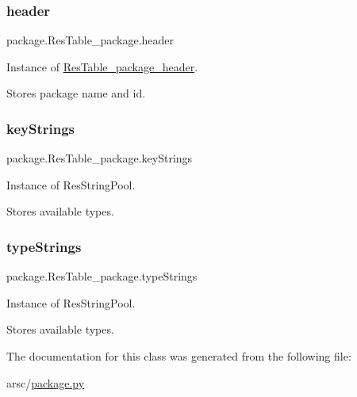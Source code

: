 \subsubsection{\texorpdfstring{header}{header}}
{\footnotesize\ttfamily package.\+Res\+Table\+\_\+package.\+header}



Instance of \mbox{\hyperlink{classpackage_1_1ResTable__package__header}{Res\+Table\+\_\+package\+\_\+header}}. 

Stores package name and id. \mbox{\label{classpackage_1_1ResTable__package_a6e813d4278285e770abe6e6659ae78e9}} 
\subsubsection{\texorpdfstring{key\+Strings}{keyStrings}}
{\footnotesize\ttfamily package.\+Res\+Table\+\_\+package.\+key\+Strings}



Instance of Res\+String\+Pool. 

Stores available types. \mbox{\label{classpackage_1_1ResTable__package_abb2bd37ba83fe03e836ecd869a1cafa6}} 
\subsubsection{\texorpdfstring{type\+Strings}{typeStrings}}
{\footnotesize\ttfamily package.\+Res\+Table\+\_\+package.\+type\+Strings}



Instance of Res\+String\+Pool. 

Stores available types. 

The documentation for this class was generated from the following file\+:\begin{DoxyCompactItemize}
\item 
arsc/\mbox{\hyperlink{package_8py}{package.\+py}}\end{DoxyCompactItemize}
